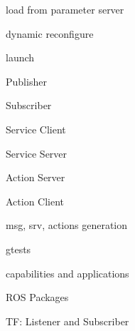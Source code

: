 \begin{DoxyEnumerate}
\begin{DoxyEnumerate}
\begin{DoxyEnumerate}
\begin{DoxyEnumerate}
\begin{DoxyEnumerate}
\item load from parameter server
\end{DoxyEnumerate}
\begin{DoxyEnumerate}
\item dynamic reconfigure
\end{DoxyEnumerate}
\end{DoxyEnumerate}
\begin{DoxyEnumerate}
\item launch
\end{DoxyEnumerate}
\begin{DoxyEnumerate}
\item Publisher
\end{DoxyEnumerate}
\begin{DoxyEnumerate}
\item Subscriber
\end{DoxyEnumerate}
\begin{DoxyEnumerate}
\item Service Client
\end{DoxyEnumerate}
\begin{DoxyEnumerate}
\item Service Server
\end{DoxyEnumerate}
\begin{DoxyEnumerate}
\item Action Server
\end{DoxyEnumerate}
\begin{DoxyEnumerate}
\item Action Client
\end{DoxyEnumerate}
\begin{DoxyEnumerate}
\item msg, srv, actions generation
\end{DoxyEnumerate}
\begin{DoxyEnumerate}
\item gtests
\end{DoxyEnumerate}
\begin{DoxyEnumerate}
\item capabilities and applications
\end{DoxyEnumerate}
\end{DoxyEnumerate}
\begin{DoxyEnumerate}
\item R\+OS Packages
\begin{DoxyEnumerate}
\item TF\+: Listener and Subscriber
\end{DoxyEnumerate}

\end{DoxyEnumerate}
\end{DoxyEnumerate}
\end{DoxyEnumerate}
